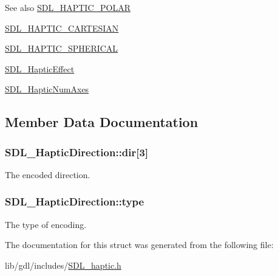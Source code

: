 \begin{DoxySeeAlso}{See also}
\hyperlink{_s_d_l__haptic_8h_acdc35e97e5525472054a67b76e518f3b}{S\+D\+L\+\_\+\+H\+A\+P\+T\+I\+C\+\_\+\+P\+O\+L\+A\+R} 

\hyperlink{_s_d_l__haptic_8h_af8b2430a363a968de2a5b64c8f663d3b}{S\+D\+L\+\_\+\+H\+A\+P\+T\+I\+C\+\_\+\+C\+A\+R\+T\+E\+S\+I\+A\+N} 

\hyperlink{_s_d_l__haptic_8h_a1fcf7cb0eaf3c39b16ba266054e25aff}{S\+D\+L\+\_\+\+H\+A\+P\+T\+I\+C\+\_\+\+S\+P\+H\+E\+R\+I\+C\+A\+L} 

\hyperlink{union_s_d_l___haptic_effect}{S\+D\+L\+\_\+\+Haptic\+Effect} 

\hyperlink{_s_d_l__haptic_8h_ad6705645197f6df4eeeea32392462483}{S\+D\+L\+\_\+\+Haptic\+Num\+Axes} 
\end{DoxySeeAlso}


\subsection{Member Data Documentation}
\hypertarget{struct_s_d_l___haptic_direction_a6cebd8118a3e61e36bd0c503ae020362}{}
\subsubsection[{dir}]{ S\+D\+L\+\_\+\+Haptic\+Direction\+::dir\mbox{[}3\mbox{]}}\label{struct_s_d_l___haptic_direction_a6cebd8118a3e61e36bd0c503ae020362}
The encoded direction. \hypertarget{struct_s_d_l___haptic_direction_acd6830ad68c4ba2af16057fa418087cc}{}
\subsubsection[{type}]{ S\+D\+L\+\_\+\+Haptic\+Direction\+::type}\label{struct_s_d_l___haptic_direction_acd6830ad68c4ba2af16057fa418087cc}
The type of encoding. 

The documentation for this struct was generated from the following file\+:\begin{DoxyCompactItemize}
\item 
lib/gdl/includes/\hyperlink{_s_d_l__haptic_8h}{S\+D\+L\+\_\+haptic.\+h}\end{DoxyCompactItemize}
